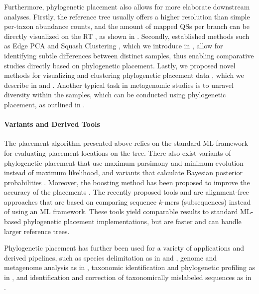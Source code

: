 Furthermore, phylogenetic placement also allows for more elaborate downstream analyses.
Firstly, the reference tree usually offers a higher resolution than simple per-taxon abundance counts,
and the amount of mapped \acp{QS} per branch can be directly visualized on the \ac{RT} \cite{Mahe2017},
as shown in .
Secondly, established methods such as Edge PCA and Squash Clustering \cite{Matsen2011a},
which we introduce in ,
allow for identifying subtle differences between distinct samples,
thus enabling comparative studies directly based on phylogenetic placement.
Lastly, we proposed novel methods for visualizing and clustering phylogenetic placement data \cite{Czech2019-analysis},
which we describe in  and .
Another typical task in metagenomic studies is to unravel diversity within the samples,
which can be conducted using phylogenetic placement, as outlined in .

\paragraph{Variants and Derived Tools}
\label{ch:Foundations:sec:PhylogeneticPlacement:sub:UseCasesApplications:par:DerivedTools}

The placement algorithm presented above relies on the standard ML framework for evaluating placement locations on the tree.
There also exist variants of phylogenetic placement that use maximum parsimony \cite{Berger2011}
and minimum evolution \cite{Filipski2015} instead of maximum likelihood,
and variants that calculate Bayesian posterior probabilities \cite{Matsen2010}.
Moreover, the boosting method  has been proposed to improve the accuracy of the placements \cite{Mirarab2012}.
The recently proposed tools  \cite{Linard2018} and  \cite{Balaban2018}
are alignment-free approaches that are based on comparing sequence $k$-mers (subsequences) instead of using an ML framework.
These tools yield comparable results to standard ML-based phylogenetic placement implementations,
but are faster and can handle larger reference trees.

Phylogenetic placement has further been used for a variety of applications and derived pipelines, such as
species delimitation as in  \cite{Zhang2013} and  \cite{Kapli2017},
genome and metagenome analysis as in  \cite{Darling2014},
taxonomic identification and phylogenetic profiling as in  \cite{Nguyen2014}, and
identification and correction of taxonomically mislabeled sequences as in  \cite{Kozlov2016}.

